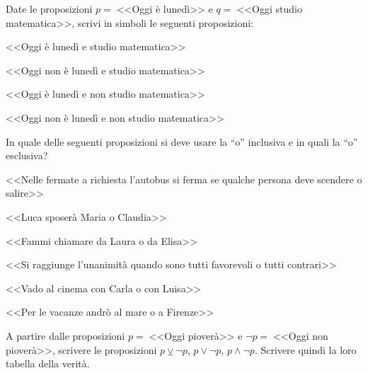 \begin{esercizio}
\label{ese:0.5}
Date le proposizioni $p=\;$<<Oggi è lunedì>> e $q=\;$<<Oggi studio matematica>>, scrivi in simboli le seguenti proposizioni:
\begin{enumeratea}
\item <<Oggi è lunedì e studio matematica>>
\item <<Oggi non è lunedì e studio matematica>>
\item <<Oggi è lunedì e non studio matematica>>
\item <<Oggi non è lunedì e non studio matematica>>
\end{enumeratea}
\end{esercizio}

\begin{esercizio}
\label{ese:0.6}
In quale delle seguenti proposizioni si deve usare la ``o'' inclusiva e in quali la ``o'' esclusiva?
\begin{enumeratea}
\item <<Nelle fermate a richiesta l'autobus si ferma se qualche persona deve scendere o salire>>
\item <<Luca sposerà Maria o Claudia>>
\item <<Fammi chiamare da Laura o da Elisa>>
\item <<Si raggiunge l'unanimità quando sono tutti favorevoli o tutti contrari>>
\item <<Vado al cinema con Carla o con Luisa>>
\item <<Per le vacanze andrò al mare o a Firenze>>
\end{enumeratea}
\end{esercizio}

\begin{esercizio}
\label{ese:0.7}
A partire dalle proposizioni $p=\;$<<Oggi pioverà>> e $\neg p=\;$<<Oggi non pioverà>>, scrivere le proposizioni $p\veebar \neg p$, $p\vee \neg p$, $p\wedge \neg p$. Scrivere quindi la loro tabella della verità.
\end{esercizio}


